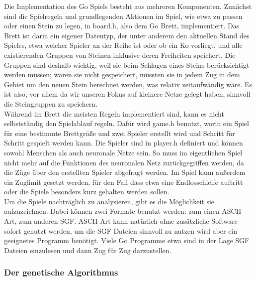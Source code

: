 \documentclass[12pt,a4paper]{article}
\begin{document}
Die Implementation des Go Spiels besteht aus mehreren Komponenten. Zunächst sind die Spielregeln und grundlegenden Aktionen im Spiel, wie etwa zu passen oder einen Stein zu legen, in board.h, also dem Go Brett, implementiert. Das Brett ist darin ein eigener Datentyp, der unter anderem den aktuellen Stand des Spieles, etwa welcher Spieler an der Reihe ist oder ob ein Ko vorliegt, und alle existierenden Gruppen von Steinen inklusive deren Freiheiten speichert. Die Gruppen sind deshalb wichtig, weil sie beim Schlagen eines Steins berücksichtigt werden müssen; wären sie nicht gespeichert, müssten sie in jedem Zug in dem Gebiet um den neuen Stein berechnet werden, was relativ zeitaufwändig wäre. Es ist also, vor allem da wir unseren Fokus auf kleinere Netze gelegt haben, sinnvoll die Steingruppen zu speichern. 
\\
Während im Brett die meisten Regeln implementiert sind, kann es nicht selbstständig den Spielablauf regeln. Dafür wird game.h benutzt, worin ein Spiel für eine bestimmte Brettgröße und zwei Spieler erstellt wird und Schritt für Schritt gespielt werden kann. Die Spieler sind in player.h definiert und können sowohl Menschen als auch neuronale Netze sein. So muss im eigentlichen Spiel nicht mehr auf die Funktionen des neuronalen Netz zurückgegriffen werden, da die Züge über den erstellten Spieler abgefragt werden. Im Spiel kann außerdem ein Zuglimit gesetzt werden, für den Fall dass etwa eine Endlosschleife auftritt oder die Spiele besonders kurz gehalten werden sollen. 
\\
Um die Spiele nachträglich zu analysieren, gibt es die Möglichkeit sie aufzuzeichnen. Dabei können zwei Formate benutzt werden: zum einen ASCII-Art, zum anderen SGF. ASCII-Art kann natürlich ohne zusätzliche Software sofort genutzt werden, um die SGF Dateien sinnvoll zu nutzen wird aber ein geeignetes Programm benötigt. Viele Go Programme etwa sind in der Lage SGF Dateien einzulesen und dann Zug für Zug darzustellen. 

\subsubsection{Der genetische Algorithmus}
\end{document}
